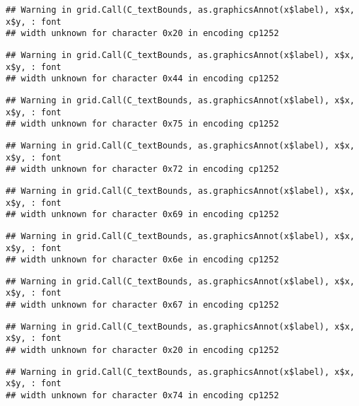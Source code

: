 \documentclass[
]{article}
\begin{document}
\begin{verbatim}
## Warning in grid.Call(C_textBounds, as.graphicsAnnot(x$label), x$x, x$y, : font
## width unknown for character 0x20 in encoding cp1252
\end{verbatim}

\begin{verbatim}
## Warning in grid.Call(C_textBounds, as.graphicsAnnot(x$label), x$x, x$y, : font
## width unknown for character 0x44 in encoding cp1252
\end{verbatim}

\begin{verbatim}
## Warning in grid.Call(C_textBounds, as.graphicsAnnot(x$label), x$x, x$y, : font
## width unknown for character 0x75 in encoding cp1252
\end{verbatim}

\begin{verbatim}
## Warning in grid.Call(C_textBounds, as.graphicsAnnot(x$label), x$x, x$y, : font
## width unknown for character 0x72 in encoding cp1252
\end{verbatim}

\begin{verbatim}
## Warning in grid.Call(C_textBounds, as.graphicsAnnot(x$label), x$x, x$y, : font
## width unknown for character 0x69 in encoding cp1252
\end{verbatim}

\begin{verbatim}
## Warning in grid.Call(C_textBounds, as.graphicsAnnot(x$label), x$x, x$y, : font
## width unknown for character 0x6e in encoding cp1252
\end{verbatim}

\begin{verbatim}
## Warning in grid.Call(C_textBounds, as.graphicsAnnot(x$label), x$x, x$y, : font
## width unknown for character 0x67 in encoding cp1252
\end{verbatim}

\begin{verbatim}
## Warning in grid.Call(C_textBounds, as.graphicsAnnot(x$label), x$x, x$y, : font
## width unknown for character 0x20 in encoding cp1252
\end{verbatim}

\begin{verbatim}
## Warning in grid.Call(C_textBounds, as.graphicsAnnot(x$label), x$x, x$y, : font
## width unknown for character 0x74 in encoding cp1252
\end{verbatim}
\end{document}
